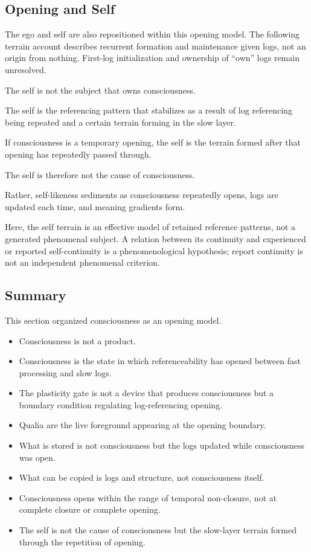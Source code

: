 \subsection{Opening and Self}


The ego and self are also repositioned within this opening model. The following terrain account describes recurrent formation and maintenance given logs, not an origin from nothing. First-log initialization and ownership of ``own'' logs remain unresolved.

The self is not the subject that owns consciousness.

The self is the referencing pattern that stabilizes as a result of log referencing being repeated and a certain terrain forming in the slow layer.

If consciousness is a temporary opening, the self is the terrain formed after that opening has repeatedly passed through.

The self is therefore not the cause of consciousness.

Rather, self-likeness sediments as consciousness repeatedly opens, logs are updated each time, and meaning gradients form.

Here, the self terrain is an effective model of retained reference patterns, not a generated phenomenal subject. A relation between its continuity and experienced or reported self-continuity is a phenomenological hypothesis; report continuity is not an independent phenomenal criterion.

\subsection{Summary}


This section organized consciousness as an opening model.

\begin{itemize}
\item Consciousness is not a product.
\item Consciousness is the state in which referenceability has opened between fast processing and slow logs.
\item The plasticity gate is not a device that produces consciousness but a boundary condition regulating log-referencing opening.
\item Qualia are the live foreground appearing at the opening boundary.
\item What is stored is not consciousness but the logs updated while consciousness was open.
\item What can be copied is logs and structure, not consciousness itself.
\item Consciousness opens within the range of temporal non-closure, not at complete closure or complete opening.
\item The self is not the cause of consciousness but the slow-layer terrain formed through the repetition of opening.
\end{itemize}

